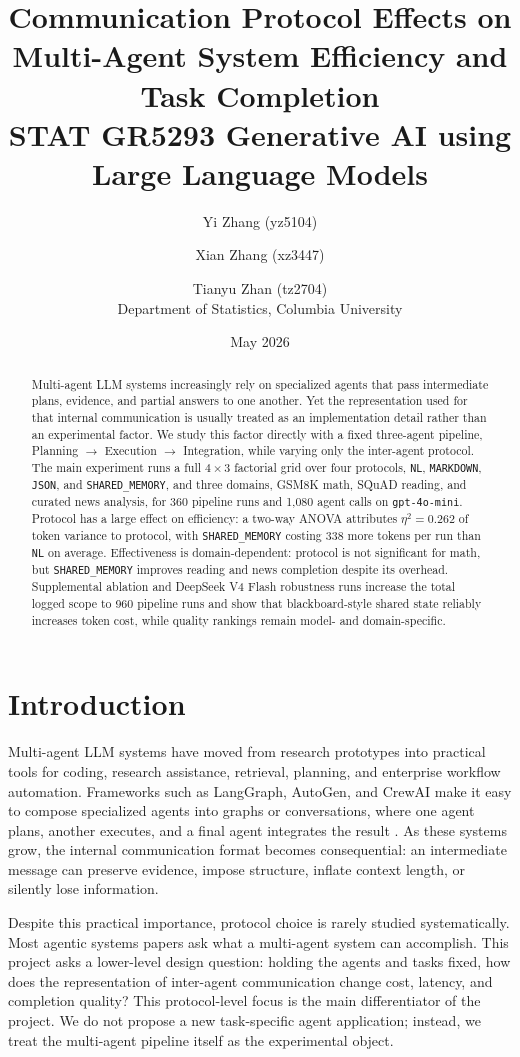\documentclass[11pt]{article}
\title{\textbf{Communication Protocol Effects on Multi-Agent System Efficiency and Task Completion}\\
\large STAT GR5293 Generative AI using Large Language Models}
\author{Yi Zhang (yz5104) \and Xian Zhang (xz3447) \and Tianyu Zhan (tz2704)\\
Department of Statistics, Columbia University}
\date{May 2026}
\newcommand{\NL}{\texttt{NL}\xspace}
\newcommand{\MD}{\texttt{MARKDOWN}\xspace}
\newcommand{\JS}{\texttt{JSON}\xspace}
\newcommand{\SM}{\texttt{SHARED\_MEMORY}\xspace}
\begin{document}
\maketitle

\begin{abstract}
Multi-agent LLM systems increasingly rely on specialized agents that pass intermediate plans, evidence, and partial answers to one another. Yet the representation used for that internal communication is usually treated as an implementation detail rather than an experimental factor. We study this factor directly with a fixed three-agent pipeline, Planning $\rightarrow$ Execution $\rightarrow$ Integration, while varying only the inter-agent protocol. The main experiment runs a full $4 \times 3$ factorial grid over four protocols, \NL, \MD, \JS, and \SM, and three domains, GSM8K math, SQuAD reading, and curated news analysis, for 360 pipeline runs and 1,080 agent calls on \texttt{gpt-4o-mini}. Protocol has a large effect on efficiency: a two-way ANOVA attributes $\eta^2=0.262$ of token variance to protocol, with \SM costing 338 more tokens per run than \NL on average. Effectiveness is domain-dependent: protocol is not significant for math, but \SM improves reading and news completion despite its overhead. Supplemental ablation and DeepSeek V4 Flash robustness runs increase the total logged scope to 960 pipeline runs and show that blackboard-style shared state reliably increases token cost, while quality rankings remain model- and domain-specific.
\end{abstract}

\section{Introduction}

Multi-agent LLM systems have moved from research prototypes into practical tools for coding, research assistance, retrieval, planning, and enterprise workflow automation. Frameworks such as LangGraph, AutoGen, and CrewAI make it easy to compose specialized agents into graphs or conversations, where one agent plans, another executes, and a final agent integrates the result \cite{langgraph, autogen, crewai}. As these systems grow, the internal communication format becomes consequential: an intermediate message can preserve evidence, impose structure, inflate context length, or silently lose information.

Despite this practical importance, protocol choice is rarely studied systematically. Most agentic systems papers ask what a multi-agent system can accomplish. This project asks a lower-level design question: holding the agents and tasks fixed, how does the representation of inter-agent communication change cost, latency, and completion quality? This protocol-level focus is the main differentiator of the project. We do not propose a new task-specific agent application; instead, we treat the multi-agent pipeline itself as the experimental object.
\end{document}
